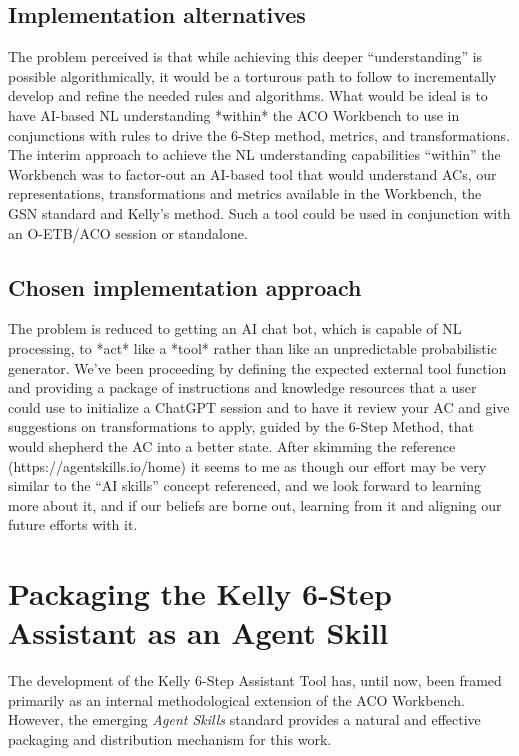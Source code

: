 \documentclass[12pt,twoside,a4paper]{article}
\begin{document}
\subsection{Implementation alternatives}
The problem perceived is that while achieving this deeper “understanding” is possible algorithmically, it would be a torturous path to follow to incrementally develop and refine the needed rules and algorithms. What would be ideal is to have AI-based NL understanding *within* the ACO Workbench to use in conjunctions with rules to drive the 6-Step method, metrics, and transformations. The interim approach to achieve the NL understanding capabilities “within” the Workbench was to factor-out an AI-based tool that would understand ACs, our representations, transformations and metrics available in the Workbench, the GSN standard and Kelly’s method. Such a tool could be used in conjunction with an O-ETB/ACO session or standalone.

\subsection{Chosen implementation approach}
The problem is reduced to getting an AI chat bot, which is capable of NL processing, to *act* like a *tool* rather than like an unpredictable probabilistic generator. We’ve been proceeding by defining the expected external tool function and providing a package of instructions and knowledge resources that a user could use to initialize a ChatGPT session and to have it review your AC and give suggestions on transformations to apply, guided by the 6-Step Method, that would shepherd the AC into a better state. After skimming the reference (https://agentskills.io/home) it seems to me as though our effort may be very similar to the “AI skills” concept referenced, and we look forward to learning more about it, and if our beliefs are borne out, learning from it and aligning our future efforts with it.

\section{Packaging the Kelly 6-Step Assistant as an Agent Skill}

The development of the Kelly 6-Step Assistant Tool has, until now, been framed primarily as an internal methodological extension of the ACO Workbench. However, the emerging \emph{Agent Skills} standard provides a natural and effective packaging and distribution mechanism for this work.
\end{document}
